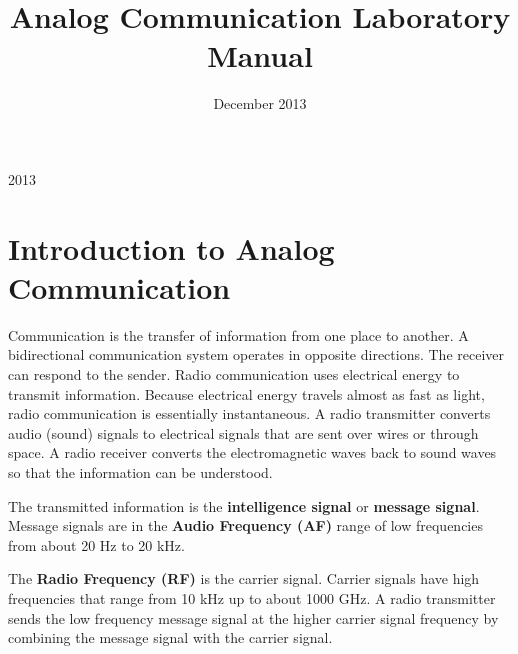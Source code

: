 \documentclass{book}
\begin{document}
\thispagestyle{empty}
\thispagestyle{empty}

\title{Analog Communication
Laboratory Manual}
\date{December 2013}
\maketitle
  
\textcopyright{}2013 
\\[10cm]
    






\thispagestyle{empty}
\tableofcontents
\thispagestyle{empty}
\thispagestyle{empty}

\listoffigures
\thispagestyle{empty}

\chapter [Introduction to Analog Communication]{Introduction to Analog Communication}


\cite{ACmanual}Communication is the transfer of information from one place to another. A bidirectional communication system operates in opposite directions. The receiver can respond
to the sender. Radio communication uses electrical energy to transmit information. Because electrical energy travels almost as fast as light, radio communication is essentially instantaneous.
A radio transmitter converts audio (sound) signals to electrical signals that are sent over wires or through space. A radio receiver converts the electromagnetic waves back to sound waves so that the
information can be understood. 

The transmitted information is the \textbf {intelligence signal} or \textbf{ message signal}.
 Message signals are in the \textbf {Audio Frequency (AF)} range of low frequencies from about 20 Hz to 20 kHz.
 
 
The \textbf{Radio Frequency (RF)}  is the carrier signal. Carrier signals have high frequencies that range from 10 kHz up to about 1000 GHz.
A radio transmitter sends the low frequency message signal at the higher carrier signal frequency by combining the message signal with the carrier signal.
\end{document}
